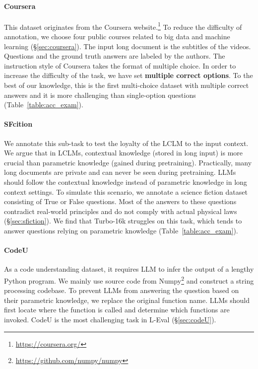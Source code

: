 \paragraph{Coursera} This dataset originates from the Coursera website.\footnote{\url{https://coursera.org/}} To reduce the difficulty of annotation, we choose four public courses related to big data and machine learning (\S\ref{sec:coursera}).
The input long document is the subtitles of the videos. Questions and the ground truth answers are labeled by the authors. The instruction style of Coursera takes the format of multiple choice. In order to increase the difficulty of the task, we have set \textbf{multiple correct options}. To the best of our knowledge, this is the first multi-choice dataset with multiple correct answers and it is more challenging than single-option questions (Table~\ref{table:acc_exam}).

\vspace{-0.7em}
\paragraph{SFcition} 
We annotate this sub-task to test the loyalty of the LCLM to the input context. We argue that in LCLMs, contextual knowledge (stored in long input) is more crucial than parametric knowledge (gained during pretraining). Practically, many long documents are private and can never be seen during pretraining. LLMs should follow the contextual knowledge instead of parametric knowledge in long context settings. To simulate this scenario, we annotate a science fiction dataset consisting of True or False questions. Most of the answers to these questions contradict real-world principles and do not comply with actual physical laws (\S\ref{sec:sfiction}). We find that Turbo-16k struggles on this task, which tends to answer questions relying on parametric knowledge (Table~\ref{table:acc_exam}).

\vspace{-0.7em}
\paragraph{CodeU} As a code understanding dataset, it requires LLM to infer the output of a lengthy Python program. We mainly use source code from Numpy\footnote{\url{https://github.com/numpy/numpy}} and construct a string processing codebase. To prevent LLMs from answering the question based on their parametric knowledge, we replace the original function name. LLMs should first locate where the function is called and determine which functions are invoked. CodeU is the most challenging task in L-Eval (\S\ref{sec:codeU}).

